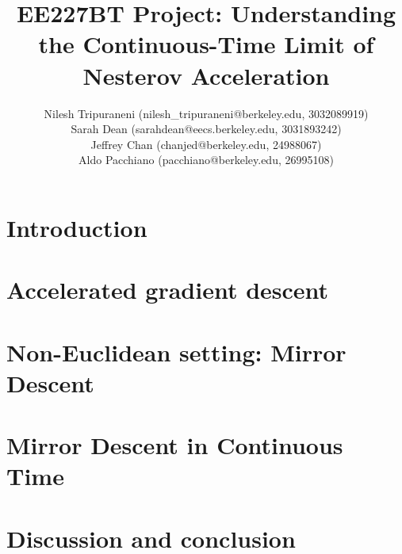 \documentclass[english]{article}
\title{EE227BT Project:
Understanding the Continuous-Time Limit of Nesterov Acceleration}
\author{Nilesh Tripuraneni (nilesh\_tripuraneni@berkeley.edu, 3032089919)\\ Sarah Dean (sarahdean@eecs.berkeley.edu, 3031893242)\\ Jeffrey Chan (chanjed@berkeley.edu, 24988067)\\ Aldo Pacchiano (pacchiano@berkeley.edu, 26995108)}
\begin{document}
\maketitle 

\section{Introduction}




\section{Accelerated gradient descent }




\section{Non-Euclidean setting: Mirror Descent}



\section{Mirror Descent in Continuous Time}


\section{Discussion and conclusion}





\end{document}
